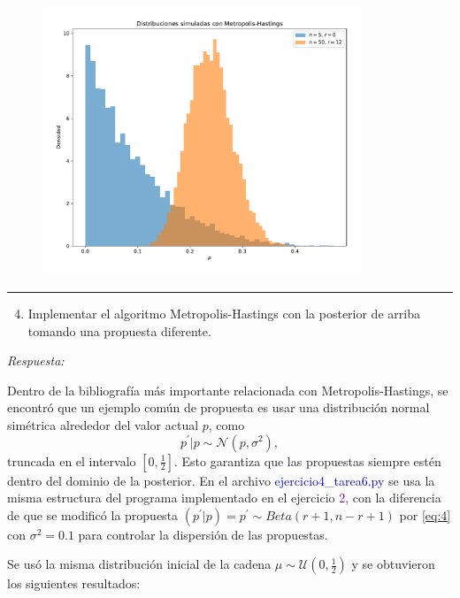 \begin{figure}[h!]
	\centering
	\includegraphics[width=0.85\textwidth]{IMAGENES/posteriormala.pdf}
\end{figure}

\vspace{5mm}
{\color{lightgray} \hrule}
\begin{enumerate} \setcounter{enumi}{3}
	\item Implementar el algoritmo Metropolis-Hastings con la posterior de arriba tomando una propuesta diferente.
\end{enumerate}

\textcolor{BrickRed}{\it Respuesta:}

Dentro de la bibliografía más importante relacionada con Metropolis-Hastings, se encontró que un ejemplo común de propuesta es usar una distribución normal simétrica alrededor del valor actual $p$, como 
\begin{equation} \label{eq:4}
	p^{'}|p \sim \mathcal{N}(p, \sigma^2) ,
\end{equation}
truncada en el intervalo $[0, \frac{1}{2}]$. Esto garantiza que las propuestas siempre estén dentro del dominio de la posterior. En el archivo \textcolor{mediumblue}{ejercicio4\_tarea6.py} se usa la misma estructura del programa implementado en el ejercicio \textcolor{Purple}{2}, con la diferencia de que se modificó la propuesta $\left(p^{'}|p\right) = p^{'} \sim Beta(r+1, n-r+1)$ por \eqref{eq:4} con $\sigma^2=	0.1$ para controlar la dispersión de las propuestas.

Se usó la misma distribución inicial de la cadena $ \mu \sim \mathcal{U} \left( 0, \frac{1}{2} \right)$ y se obtuvieron los siguientes resultados:

